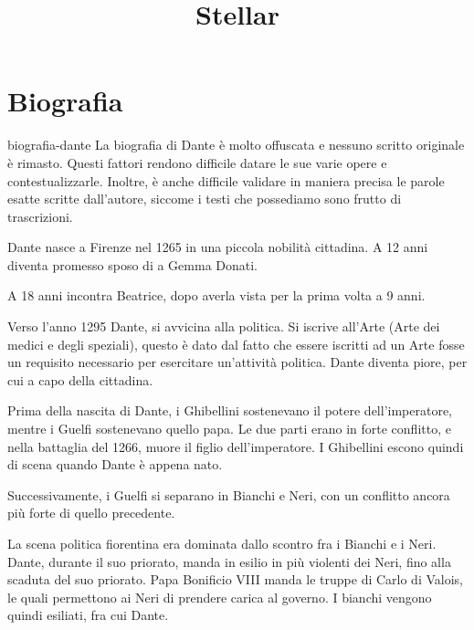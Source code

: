\documentclass[preview]{standalone}
\begin{document}
\title{Stellar}
\genpage

\section{Biografia}

\begin{snippet}{biografia-dante}
    La biografia di Dante è molto offuscata e nessuno scritto originale è rimasto.
    Questi fattori rendono difficile datare le sue varie opere e contestualizzarle. Inoltre,
    è anche difficile validare in maniera precisa le parole esatte scritte dall'autore, siccome i testi che possediamo
    sono frutto di trascrizioni.
    
    Dante nasce a Firenze nel 1265 in una piccola nobilità cittadina.
    A 12 anni diventa promesso sposo di a Gemma Donati.
    
    A 18 anni incontra Beatrice, dopo averla vista per la prima volta a 9 anni.
    
    Verso l'anno 1295 Dante, si avvicina alla politica.
    Si iscrive all'Arte (Arte dei medici e degli speziali), questo è dato dal fatto che essere iscritti ad un Arte
    fosse un requisito necessario per esercitare un'attività politica. Dante diventa piore, per cui a capo della cittadina. %
    
    Prima della nascita di Dante, i Ghibellini sostenevano il potere dell'imperatore, mentre i Guelfi sostenevano quello papa.
    Le due parti erano in forte conflitto, e nella battaglia del 1266, muore il figlio dell'imperatore.
    I Ghibellini escono quindi di scena quando Dante è appena nato.
    
    Successivamente, i Guelfi si separano in Bianchi e Neri, con un conflitto ancora più forte di quello precedente.
    
    La scena politica fiorentina era dominata dallo scontro fra i Bianchi e i Neri.
    Dante, durante il suo priorato, manda in esilio in più violenti dei Neri, fino alla scaduta del suo priorato.
    Papa Bonificio VIII manda le truppe di Carlo di Valois, le quali permettono ai Neri di prendere carica al governo.
    I bianchi vengono quindi esiliati, fra cui Dante.
\end{snippet}
\end{document}
